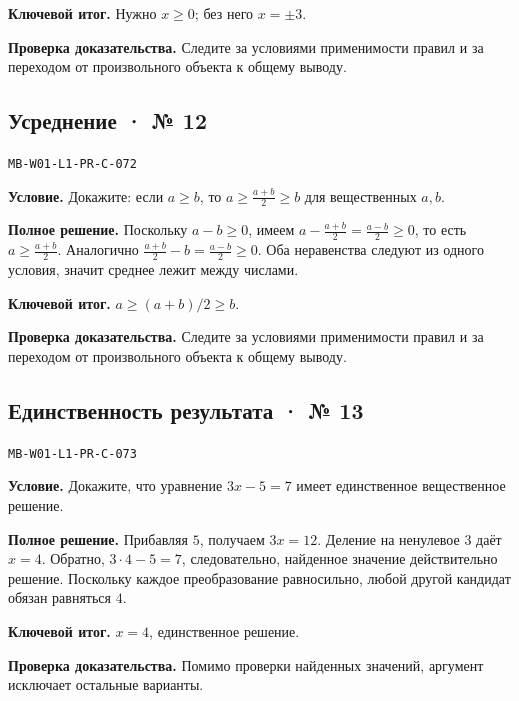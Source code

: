 \documentclass[11pt,a4paper,openany]{book}
\newcommand{\muid}[1]{\texttt{\footnotesize #1}}
\begin{document}
\begin{learnbox}\textbf{Ключевой итог.} Нужно $x\ge0$; без него $x=\pm3$.\par \textbf{Проверка доказательства.} 
Следите за условиями применимости правил и за переходом от произвольного объекта к общему выводу. 
\end{learnbox}

\subsection*{Усреднение · № 12}\hypertarget{solution:MB-W01-L1-PR-C-072}{}

\muid{MB-W01-L1-PR-C-072}\par

\textbf{Условие.} Докажите: если $a\ge b$, то $a\ge\frac{a+b}{2}\ge b$ для вещественных $a,b$.\par

\textbf{Полное решение.} Поскольку $a-b\ge0$, имеем $a-\frac{a+b}{2}=\frac{a-b}{2}\ge0$, то есть $a\ge\frac{a+b}{2}$. Аналогично $\frac{a+b}{2}-b=\frac{a-b}{2}\ge0$. Оба неравенства следуют из одного условия, значит среднее лежит между числами.


\begin{learnbox}\textbf{Ключевой итог.} $a\ge(a+b)/2\ge b$.\par \textbf{Проверка доказательства.} 
Следите за условиями применимости правил и за переходом от произвольного объекта к общему выводу. 
\end{learnbox}

\subsection*{Единственность результата · № 13}\hypertarget{solution:MB-W01-L1-PR-C-073}{}

\muid{MB-W01-L1-PR-C-073}\par

\textbf{Условие.} Докажите, что уравнение $3x-5=7$ имеет единственное вещественное решение.\par

\textbf{Полное решение.} Прибавляя $5$, получаем $3x=12$. Деление на ненулевое $3$ даёт $x=4$. Обратно, $3\cdot4-5=7$, следовательно, найденное значение действительно решение. Поскольку каждое преобразование равносильно, любой другой кандидат обязан равняться $4$.


\begin{learnbox}\textbf{Ключевой итог.} $x=4$, единственное решение.\par \textbf{Проверка доказательства.} 
Помимо проверки найденных значений, аргумент исключает остальные варианты. 
\end{learnbox}
\end{document}
